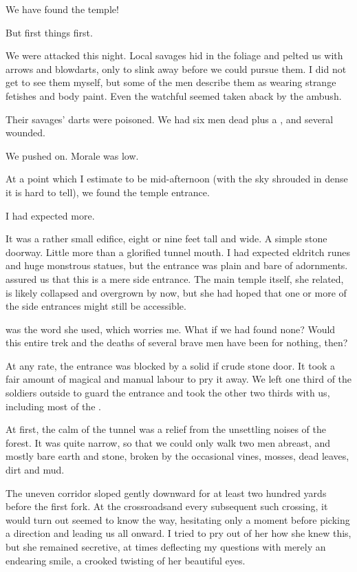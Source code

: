 \begin{diary}%
\diarystamp{\dateWaythaneDayFourTempleFound}

\new
%
We have found the temple! 

But first things first. 

We were attacked this night. Local savages hid in the foliage and pelted us with arrows and blowdarts, only to slink away before we could pursue them. 
I did not get to see them myself, but some of the men describe them as \meccara{} wearing strange fetishes and body paint. Even the watchful \Takestsha{} seemed taken aback by the ambush. 

Their savages' darts were poisoned. We had six men dead plus a , and several wounded. 

We pushed on. Morale was low. 

At a point which I estimate to be mid-afternoon (with the sky shrouded in dense \wildfog{} it is hard to tell), we found the temple entrance. 

I had expected more. 

It was a rather small edifice, eight or nine feet tall and wide. A simple stone doorway. Little more than a glorified tunnel mouth. I had expected eldritch runes and huge monstrous statues, but the entrance was plain and bare of adornments. \Takestsha{} assured us that this is a mere side entrance. The main temple itself, she related, is likely collapsed and overgrown by now, but she had hoped that one or more of the side entrances might still be accessible. 

 was the word she used, which worries me. What if we had found none? Would this entire trek and the deaths of several brave men have been for nothing, then? 

At any rate, the entrance was blocked by a solid if crude stone door. It took a fair amount of magical and manual labour to pry it away. 
%
We left one third of the soldiers outside to guard the entrance and took the other two thirds with us, including most of the \relcs. 

At first, the calm of the tunnel was a relief from the unsettling noises of the forest. 
It was quite narrow, so that we could only walk two men abreast, and mostly bare earth and stone, broken by the occasional vines, mosses, dead leaves, dirt and mud. 

The uneven corridor sloped gently downward for at least two hundred yards before the first fork. At the crossroads\dash and every subsequent such crossing, it would turn out\dash\Takestsha{} seemed to know the way, hesitating only a moment before picking a direction and leading us all onward. I tried to pry out of her how she knew this, but she remained secretive, at times deflecting my questions with merely an endearing smile, a crooked twisting of her beautiful eyes. 


\end{diary}
